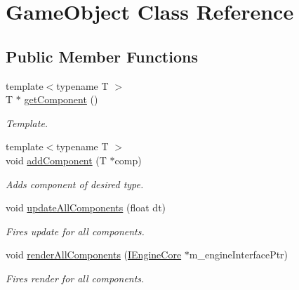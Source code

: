 \hypertarget{class_game_object}{}\section{Game\+Object Class Reference}
\label{class_game_object}
\subsection*{Public Member Functions}
\begin{DoxyCompactItemize}
\item 
{\footnotesize template$<$typename T $>$ }\\T $\ast$ \mbox{\hyperlink{class_game_object_a1c50376c7f24439359a3962f57dfd513}{get\+Component}} ()
\begin{DoxyCompactList}\small\item\em Template. \end{DoxyCompactList}\item 
\mbox{\label{class_game_object_aff400b6c6e3c6af0b42fe49adb786174}} 
{\footnotesize template$<$typename T $>$ }\\void \mbox{\hyperlink{class_game_object_aff400b6c6e3c6af0b42fe49adb786174}{add\+Component}} (T $\ast$comp)
\begin{DoxyCompactList}\small\item\em Adds component of desired type. \end{DoxyCompactList}\item 
\mbox{\label{class_game_object_a9f4d3988cee6c0dd1a2846d92265359e}} 
void \mbox{\hyperlink{class_game_object_a9f4d3988cee6c0dd1a2846d92265359e}{update\+All\+Components}} (float dt)
\begin{DoxyCompactList}\small\item\em Fires update for all components. \end{DoxyCompactList}\item 
\mbox{\label{class_game_object_a3e93bca635ff45cef4f4853545c1b2c4}} 
void \mbox{\hyperlink{class_game_object_a3e93bca635ff45cef4f4853545c1b2c4}{render\+All\+Components}} (\mbox{\hyperlink{class_i_engine_core}{I\+Engine\+Core}} $\ast$m\+\_\+engine\+Interface\+Ptr)
\begin{DoxyCompactList}\small\item\em Fires render for all components. \end{DoxyCompactList}\end{DoxyCompactItemize}
